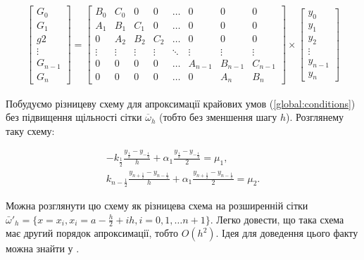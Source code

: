 \begin{align} \label{linear_system}
\left[ \begin{array}{c} G_0 \\ G_1 \\ g2 \\ \vdots \\ G_{n-1} \\ G_n \end{array} \right] = 
\begin{bmatrix} 
B_0 & C_0 & 0 & 0 & \dots & 0 & 0 & 0\\ 
A_1 & B_1 & C_1 & 0 & \dots & 0 & 0 & 0\\ 
0 & A_2 & B_2 & C_2 & \dots & 0 & 0 & 0\\ 
\vdots & \vdots & \vdots & \vdots & \ddots & \vdots & \vdots & \vdots \\
0 & 0 & 0 & 0 & \dots & A_{n-1} & B_{n-1} & C_{n-1} \\
0 & 0 & 0 & 0 & \dots & 0 & A_n & B_n
\end{bmatrix} \times \left[ \begin{array}{c} y_0 \\ y_1 \\ y_2 \\ \vdots \\ y_{n-1} \\ y_n \end{array} \right]
\end{align}

Побудуємо різницеву схему для апроксимації крайових умов (\ref{global:conditions}) без підвищення щільності сітки \(\overline{\omega}_h\) (тобто без зменшення шагу \(h\)). Розглянему таку схему:

\begin{equation}
\begin{multlined} \label{diff:boundary_general}
-k_{\frac{1}{2}} \frac{y_{\frac{1}{2}} - y_{-\frac{1}{2}}}{h} + \alpha_1 \frac{y_{\frac{1}{2}} - y_{-\frac{1}{2}}}{2} = \mu_1, \\
k_{n - \frac{1}{2}} \frac{y_{n + \frac{1}{2}} - y_{n-\frac{1}{2}}}{h} + \alpha_1 \frac{y_{n+\frac{1}{2}} - y_{n-\frac{1}{2}}}{2} = \mu_2.
\end{multlined}
\end{equation}

Можна розглянути цю схему як різницева схема на розширенній сітки \( \bar{\omega}'_h = \{ x = x_i, x_i = a - \frac{h}{2} + ih, i = 0, 1, \dots n+1\}\). Легко довести, що така схема має другий порядок апроксимації, тобто \( O(h^2)\). Ідея для доведення цього факту можна знайти у \cite[с. 148--149]{Samarskii71}.

